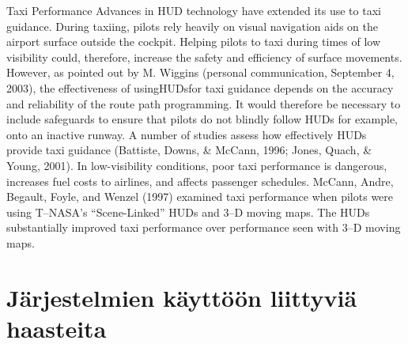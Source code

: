 \documentclass[utf8,bachelor,manualbib]{gradu3}
\begin{document}
Taxi Performance
Advances in HUD technology have extended its use to taxi guidance. During taxiing,
pilots rely heavily on visual navigation aids on the airport surface outside the
cockpit. Helping pilots to taxi during times of low visibility could, therefore, increase
the safety and efficiency of surface movements. However, as pointed out by
M. Wiggins (personal communication, September 4, 2003), the effectiveness of usingHUDsfor
taxi guidance depends on the accuracy and reliability of the route path
programming. It would therefore be necessary to include safeguards to ensure that
pilots do not blindly follow HUDs for example, onto an inactive runway.
A number of studies assess how effectively HUDs provide taxi guidance
(Battiste, Downs, \& McCann, 1996; Jones, Quach, \& Young, 2001). In
low-visibility conditions, poor taxi performance is dangerous, increases fuel costs
to airlines, and affects passenger schedules. McCann, Andre, Begault, Foyle, and
Wenzel (1997) examined taxi performance when pilots were using T–NASA’s
“Scene-Linked” HUDs and 3–D moving maps. The HUDs substantially improved
taxi performance over performance seen with 3–D moving maps. \citep{crawford2006}
































































\chapter{Järjestelmien käyttöön liittyviä haasteita}
\end{document}
